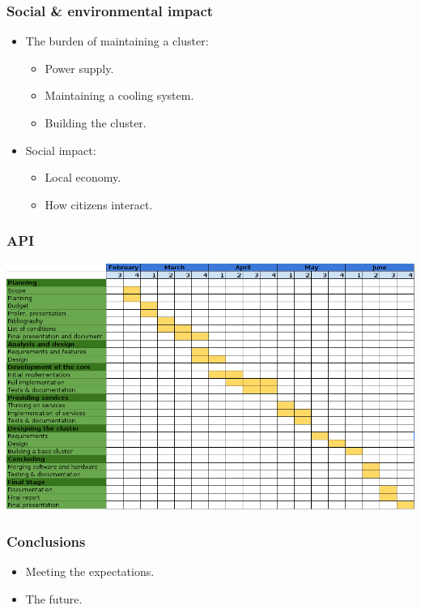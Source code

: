 \documentclass[12pt]{beamer}
\begin{document}
\begin{frame}
\vfill
  \frametitle{Social \& environmental impact}
  \begin{itemize}
    \item The burden of maintaining a cluster:
    \vfill
    \begin{itemize}
      \item Power supply.
      \vfill
      \item Maintaining a cooling system.
      \vfill
      \item Building the cluster.
      \vfill
    \end{itemize}
    \vfill
    \item Social impact:
    \vfill
    \begin{itemize}
      \item Local economy.
      \vfill
      \item How citizens interact.
      \vfill
    \end{itemize}

  \end{itemize}
\vfill
\end{frame}

\begin{frame}
\vfill
  \frametitle{API}
  \begin{center}
    \includegraphics[scale=0.45]{images/gantt.png}
  \end{center}
\vfill
\end{frame}

\begin{frame}
\vfill
  \frametitle{Conclusions}
  \begin{itemize}
    \item Meeting the expectations.
    \vfill
    \item The future.
    \vfill
  \end{itemize}
\vfill
\end{frame}
\end{document}
